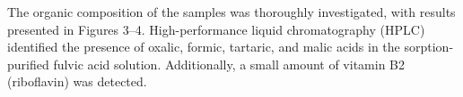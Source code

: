 % 
% 
% 
% 
% 
% 
% 
% 
% 
% 
% 
% 
% 
% 
% 
% 
% 
% 
% 
% 
% 
% 
% 
% 
% 
% 
% 
% 
% 
% 

The organic composition of the samples was thoroughly investigated, with
results presented in Figures 3--4. High-performance liquid
chromatography (HPLC) identified the presence of oxalic, formic,
tartaric, and malic acids in the sorption-purified fulvic acid solution.
Additionally, a small amount of vitamin B2 (riboflavin) was detected.

